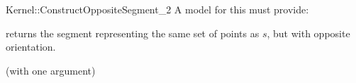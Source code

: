 \begin{ccRefFunctionObjectConcept}{Kernel::ConstructOppositeSegment_2}
A model for this must provide:


{returns the segment representing the same set of points as $s$,
but with opposite orientation.}

\ccRefines
{} (with one argument)

\ccSeeAlso
{}\\

\end{ccRefFunctionObjectConcept}
